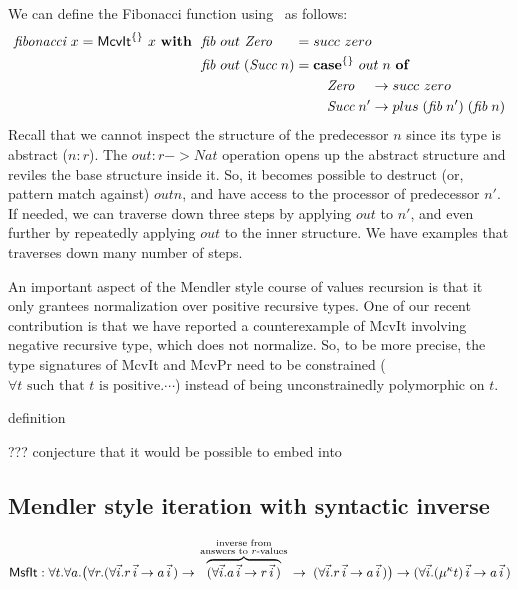 We can define the Fibonacci function using \McvIt\ as follows:
\begin{align*}
\textit{fibonacci}~x = \textsf{McvIt}^{\{\}}~x~\textbf{with}~~
&  \textit{fib} ~out ~\textit{Zero}~~~~\; = succ~zero \\
&  \textit{fib} ~out \;(\textit{Succ}\;n) =
            \textbf{case}^{\{\}}~out\;n~\textbf{of} \\
&\qquad\qquad\qquad\qquad\quad
              \textit{Zero}~~~\, -> succ~zero \\
&\qquad\qquad\qquad\qquad\quad
              \textit{Succ}\;n'  -> plus\;(\textit{fib}\;n')\;(\textit{fib}\;n)
\end{align*}
Recall that we cannot inspect the structure of the predecessor $n$ since
its type is abstract ($n:r$). The $out : r -> \textit{Nat}$ operation opens up
the abstract structure and reviles the base structure inside it. So, it
becomes possible to destruct (or, pattern match against) $out n$, and have
access to the processor of predecessor $n'$. If needed, we can traverse down
three steps by applying $out$ to $n'$, and even further by repeatedly applying
$out$ to the inner structure. We have examples that traverses down many
number of steps.

An important aspect of the Mendler style course of values recursion is that
it only grantees normalization over positive recursive types. One of our
recent contribution is that we have reported a counterexample of \textsf{McvIt}
involving negative recursive type, which does not normalize. So, to be more
precise, the type signatures of \textsf{McvIt} and \textsf{McvPr} need to
be constrained ($\forall t \text{~such that~$t$ is positive}.\cdots$)
instead of being unconstrainedly polymorphic on $t$.

definition

???
conjecture that it would be possible to embed into \Fixw

\subsection{Mendler style iteration with syntactic inverse}
\label{sec:mendler:sf}
\begin{multline*}
 \textsf{MsfIt} : \forall t . \forall a .
   \big( \forall r.
            (\forall\vec{i} . r\,\vec{i} -> a\,\vec{i}\,)
   -> \overset{\begin{smallmatrix}
                        \text{inverse from} \\
                        \text{answers to $r$-values} \\
                       \end{smallmatrix}}{\overbrace{
            (\forall\vec{i} . a\,\vec{i} -> r\,\vec{i}\,) }}
   -> \;    (\forall\vec{i} . r\,\vec{i} -> a\,\vec{i}\,)
   \big)
 -> (\forall\vec{i} . (\mu^\kappa t)\,\vec{i} -> a\,\vec{i}\,)
\end{multline*}



